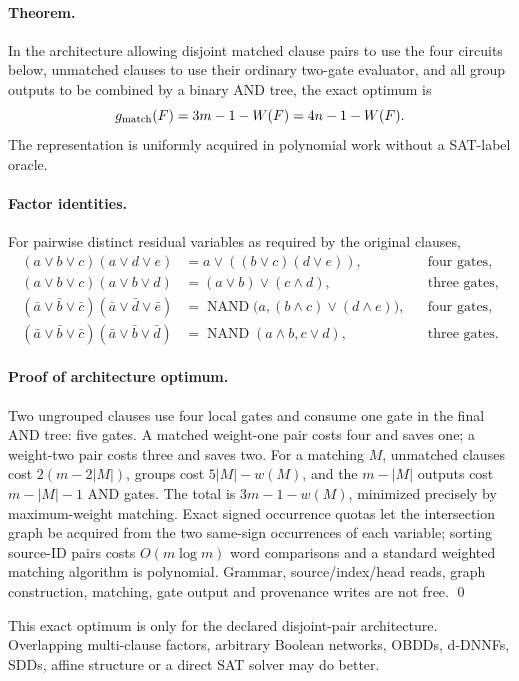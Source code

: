 \documentclass[11pt]{article}
\begin{document}
\paragraph{Theorem.}
In the architecture allowing disjoint matched clause pairs to use the four circuits below,
unmatched clauses to use their ordinary two-gate evaluator, and all group outputs to be
combined by a binary AND tree, the exact optimum is
\[
       g_{\rm match}(F)=3m-1-W(F)=4n-1-W(F).
\]
The representation is uniformly acquired in polynomial work without a SAT-label oracle.

\paragraph{Factor identities.}
For pairwise distinct residual variables as required by the original clauses,
\begin{align*}
(a\vee b\vee c)(a\vee d\vee e)
 &=a\vee((b\vee c)(d\vee e)), &&\text{four gates},\\
(a\vee b\vee c)(a\vee b\vee d)
 &=(a\vee b)\vee(c\wedge d), &&\text{three gates},\\
(\bar a\vee\bar b\vee\bar c)(\bar a\vee\bar d\vee\bar e)
 &=\operatorname{NAND}\bigl(a,(b\wedge c)\vee(d\wedge e)\bigr), &&\text{four gates},\\
(\bar a\vee\bar b\vee\bar c)(\bar a\vee\bar b\vee\bar d)
 &=\operatorname{NAND}(a\wedge b,c\vee d), &&\text{three gates}.
\end{align*}

\paragraph{Proof of architecture optimum.}
Two ungrouped clauses use four local gates and consume one gate in the final AND tree: five
gates.  A matched weight-one pair costs four and saves one; a weight-two pair costs three and
saves two.  For a matching $M$, unmatched clauses cost $2(m-2|M|)$, groups cost
$5|M|-w(M)$, and the $m-|M|$ outputs cost $m-|M|-1$ AND gates.  The total is
$3m-1-w(M)$, minimized precisely by maximum-weight matching.  Exact signed occurrence quotas
let the intersection graph be acquired from the two same-sign occurrences of each variable;
sorting source-ID pairs costs $O(m\log m)$ word comparisons and a standard weighted matching
algorithm is polynomial.  Grammar, source/index/head reads, graph construction, matching,
gate output and provenance writes are not free. \qed

This exact optimum is only for the declared disjoint-pair architecture.  Overlapping
multi-clause factors, arbitrary Boolean networks, OBDDs, d-DNNFs, SDDs, affine structure or a
direct SAT solver may do better.
\end{document}
